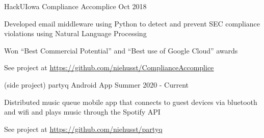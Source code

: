 \documentclass[12pt, a4paper]{awesome-cv}
\begin{document}
\begin{cventries}

    \cventry
	{HackUIowa}
 	{Compliance Accomplice}
	{Oct 2018}
	{}
	{
	  \begin{cvitems}
	     \item{Developed email middleware using Python to detect and prevent SEC compliance violations using Natural Language Processing}
	     \item{Won “Best Commercial Potential” and “Best use of Google Cloud” awards}
	     \item{See project at \underline{\href{https://github.com/niehusst/ComplianceAccomplice}{https://github.com/niehusst/ComplianceAccomplice}}} 
	  \end{cvitems}
	}

  \cventry
    {(side project)}
    {partyq Android App}
    {Summer 2020 - Current}
    {}
    {
      \begin{cvitems}
        \item{Distributed music queue mobile app that connects to guest devices via bluetooth and wifi and plays music through the Spotify API}
        \item{See project at \underline{\href{https://github.com/niehusst/partyq}{https://github.com/niehusst/partyq}}}
      \end{cvitems}
    }




\end{cventries}
\end{document}
